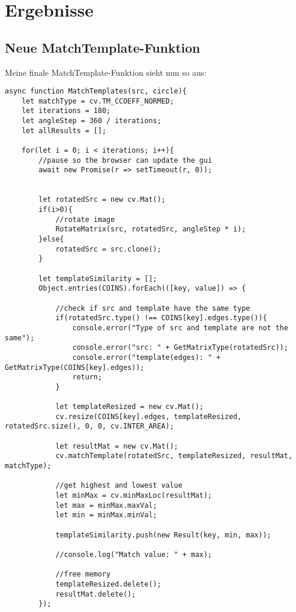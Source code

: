 \section{Ergebnisse}

\subsection{Neue MatchTemplate-Funktion}
Meine finale MatchTemplate-Funktion sieht nun so aus:

\begin{lstlisting}[style=JavaScript]
async function MatchTemplates(src, circle){
    let matchType = cv.TM_CCOEFF_NORMED;
    let iterations = 180;
    let angleStep = 360 / iterations;
    let allResults = [];

    for(let i = 0; i < iterations; i++){
        //pause so the browser can update the gui
        await new Promise(r => setTimeout(r, 0));


        let rotatedSrc = new cv.Mat();
        if(i>0){
            //rotate image
            RotateMatrix(src, rotatedSrc, angleStep * i);
        }else{
            rotatedSrc = src.clone();
        }

        let templateSimilarity = [];
        Object.entries(COINS).forEach(([key, value]) => {

            //check if src and template have the same type
            if(rotatedSrc.type() !== COINS[key].edges.type()){
                console.error("Type of src and template are not the same");
                console.error("src: " + GetMatrixType(rotatedSrc));
                console.error("template(edges): " + GetMatrixType(COINS[key].edges));
                return;
            }

            let templateResized = new cv.Mat();
            cv.resize(COINS[key].edges, templateResized, rotatedSrc.size(), 0, 0, cv.INTER_AREA);

            let resultMat = new cv.Mat();
            cv.matchTemplate(rotatedSrc, templateResized, resultMat, matchType);

            //get highest and lowest value
            let minMax = cv.minMaxLoc(resultMat);
            let max = minMax.maxVal;
            let min = minMax.minVal;

            templateSimilarity.push(new Result(key, min, max));

            //console.log("Match value: " + max);

            //free memory
            templateResized.delete();
            resultMat.delete();
        });


\end{lstlisting}

